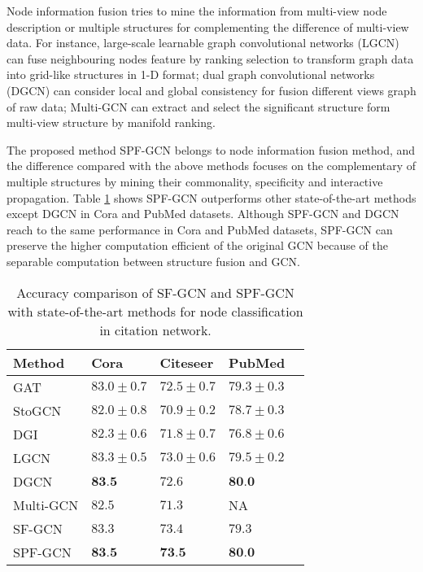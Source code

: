 \documentclass[review]{elsarticle}
\begin{document}
Node information fusion tries to mine the information from multi-view node description or multiple structures for complementing the difference of multi-view data. For instance, large-scale learnable graph convolutional networks (LGCN) can fuse neighbouring nodes feature by ranking selection to transform graph data into grid-like structures in 1-D format\cite{2018arXiv180803965G}; dual graph convolutional networks (DGCN) can consider local and global consistency for fusion different views graph of raw data\cite{zhuang2018dual}; Multi-GCN can extract and select the significant structure form multi-view structure by manifold ranking\cite{khan2019multi}.

The proposed method SPF-GCN belongs to node information fusion method, and the difference compared with the above methods focuses on the complementary of multiple structures by mining their commonality, specificity and interactive propagation. Table \ref{table4} shows SPF-GCN outperforms other state-of-the-art methods except DGCN in Cora and PubMed datasets. Although SPF-GCN and DGCN reach to the same performance in Cora and PubMed datasets, SPF-GCN can preserve the higher computation efficient of the original GCN because of the separable computation between structure fusion and GCN.

\begin{table}[!ht]
\small
\renewcommand{\arraystretch}{1.0}
\caption{Accuracy comparison of SF-GCN and SPF-GCN with state-of-the-art methods for node classification in citation network.}
\label{table4}
\begin{center}
\newcommand{\tabincell}[2]{\begin{tabular}{@{}#1@{}}#2\end{tabular}}
\begin{tabular}{lp{2cm}p{2cm}p{2cm}p{2cm}}
\hline
\bfseries Method &\bfseries Cora &\bfseries Citeseer &\bfseries PubMed  \\
\hline \hline
GAT\cite{Veli2017Graph} & $83.0\pm0.7$   &$72.5\pm0.7$ & $79.3\pm0.3$    \\
\hline
StoGCN\cite{2017arXiv171010568C}  & $82.0\pm0.8$   &$70.9\pm0.2$ & $78.7\pm0.3$   \\
\hline
DGI\cite{Veli2018Deep}  & $82.3\pm0.6$   &$71.8\pm0.7$ & $76.8\pm0.6$   \\
\hline
LGCN\cite{2018arXiv180803965G}   & $83.3\pm0.5$   &$73.0\pm0.6$ & $79.5\pm0.2$   \\
\hline
DGCN\cite{zhuang2018dual}  & $\textbf{83.5}$   &$72.6$ & $\textbf{80.0}$   \\
\hline
Multi-GCN\cite{khan2019multi}  & $82.5$   &$71.3$ & NA   \\
\hline\hline
SF-GCN & $83.3$   &$73.4$ & $79.3$   \\
\hline
SPF-GCN  & $\textbf{83.5}$   &$\textbf{73.5}$  & $\textbf{80.0}$  \\
\hline
\end{tabular}
\end{center}
\end{table}
\end{document}
